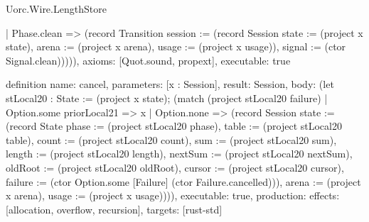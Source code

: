 \begin{lexlean}{Uorc.Wire.LengthStore}
\begin{semanticmodule}
{      | Phase.clean => (record Transition {session := (record Session {state := (project x state), arena := (project x arena), usage := (project x usage)}), signal := (ctor Signal.clean)})))),
  axioms: [Quot.sound, propext],
  executable: true
}

definition{
  name: cancel,
  parameters: [x : Session],
  result: Session,
  body: (let stLocal20 : State := (project x state); (match (project stLocal20 failure)
    | Option.some priorLocal21 => x
    | Option.none => (record Session {state := (record State {phase := (project stLocal20 phase), table := (project stLocal20 table), count := (project stLocal20 count), sum := (project stLocal20 sum), length := (project stLocal20 length), nextSum := (project stLocal20 nextSum), oldRoot := (project stLocal20 oldRoot), cursor := (project stLocal20 cursor), failure := (ctor Option.some [Failure] (ctor Failure.cancelled))}), arena := (project x arena), usage := (project x usage)}))),
  executable: true,
  production: {effects: [allocation, overflow, recursion], targets: [rust-std]}
}


\end{semanticmodule}
\end{lexlean}
